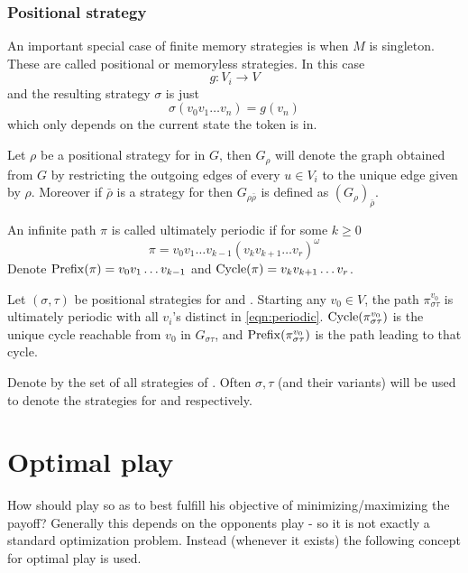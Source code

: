 \subsubsection{Positional strategy}
An important special case of finite memory strategies is when $M$ is singleton. These are called positional or memoryless strategies. In this case
\[
    g : V_i \to V
\]
and the resulting strategy $\sigma$ is just
\[
    \sigma( v_0 v_1 \ldots v_n ) = g(v_n)
\]
which only depends on the current state the token is in.

Let $\rho$ be a positional strategy for  in $G$, then $G_{\rho}$ will denote the graph obtained from $G$ by restricting the outgoing edges of every $u\in V_i$ to the unique edge given by $\rho$. Moreover if $\bar{\rho}$ is a strategy for  then $G_{\rho\bar{\rho}}$ is defined as $(G_\rho)_{\bar{\rho}}$.

An infinite path $\pi$ is called ultimately periodic if for some $k \geq 0$
\begin{equation}
    \pi = v_0 v_1 \ldots v_{k-1} (v_k v_{k+1} \ldots v_r)^\omega \label{eqn:periodic}
\end{equation}
Denote $\operatorname{Prefix}(\pi)=v_0 v_1 \ldots v_{k-1}$ and $\operatorname{Cycle}(\pi)=v_k v_{k+1} \ldots v_r$.

\label{par:ultperiodic} Let $(\sigma,\tau)$ be positional strategies for  and . Starting any $v_0 \in V$, the path $\pi^{v_0}_{\sigma\tau}$ is ultimately periodic with all $v_i$'s distinct in \eqref{eqn:periodic}.  $\operatorname{Cycle}(\pi^{v_0}_{\sigma\tau})$ is the unique cycle reachable from $v_0$ in $G_{\sigma\tau}$, and $\operatorname{Prefix}(\pi^{v_0}_{\sigma\tau})$ is the path leading to that cycle.

Denote by  the set of all strategies of . Often $\sigma,\tau$ (and their variants) will be used to denote the strategies for  and  respectively.


\section{Optimal play}
How should  play so as to best fulfill his objective of minimizing/maximizing the payoff? Generally this depends on the opponents play - so it is not exactly a standard optimization problem. Instead (whenever it exists) the following concept for optimal play is used.
